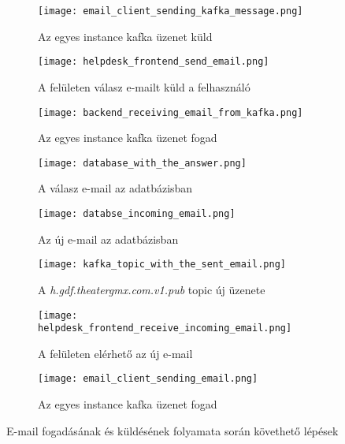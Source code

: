 \begin{figure}
	\begin{subfigure}{.49\textwidth}
		\centering
		\texttt{[image: email\_client\_sending\_kafka\_message.png]}  
		\caption{Az egyes instance kafka üzenet küld}
		\label{fig:email_client_send_kafka}
	\end{subfigure}
	\begin{subfigure}{.49\textwidth}
		\centering
		\texttt{[image: helpdesk\_frontend\_send\_email.png]}  
		\caption{A felületen válasz e-mailt küld a felhasználó}
		\label{fig:frontend_send_answer}
	\end{subfigure}
	
	\quad
	
	\begin{subfigure}{.49\textwidth}
		\centering
		\texttt{[image: backend\_receiving\_email\_from\_kafka.png]}  
		\caption{Az egyes instance kafka üzenet fogad}
		\label{fig:backend_receive_kafka}
	\end{subfigure}
	\begin{subfigure}{.49\textwidth}
		\centering
		\texttt{[image: database\_with\_the\_answer.png]}  
		\caption{A válasz e-mail az adatbázisban}
		\label{fig:database_answer}
	\end{subfigure}

	\quad

\begin{subfigure}{.49\textwidth}
	\centering
	\texttt{[image: databse\_incoming\_email.png]}  
	\caption{Az új e-mail az adatbázisban}
	\label{fig:datbase_received_email}
\end{subfigure}
\begin{subfigure}{.49\textwidth}
	\centering
	\texttt{[image: kafka\_topic\_with\_the\_sent\_email.png]}  
	\caption{A \textit{h.gdf.theater\textunderscore gmx.com.v1.pub} topic új üzenete}
	\label{fig:kafka_topic_send_email}
\end{subfigure}

	\quad

\begin{subfigure}{.45\textwidth}
	\centering
	\texttt{[image: helpdesk\_frontend\_receive\_incoming\_email.png]}  
	\caption{A felületen elérhető az új e-mail}
	\label{fig:frontend_read_email}
\end{subfigure}
\begin{subfigure}{.45\textwidth}
	\centering
	\texttt{[image: email\_client\_sending\_email.png]}  
	\caption{Az egyes instance kafka üzenet fogad}
	\label{fig:email_client_receives_kafka}
\end{subfigure}

	\caption[E-mail fogadásának és küldésének folyamata]{E-mail fogadásának és küldésének folyamata során követhető lépések}
	\label{fig:email_send_receive_visible}
\end{figure}



